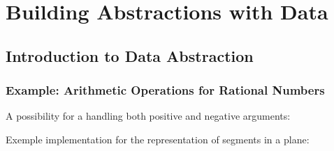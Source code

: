 \chapter{Building Abstractions with Data}

\section{Introduction to Data Abstraction}

\subsection{Example: Arithmetic Operations for Rational Numbers}

\begin{exe}[2.1]
    A possibility for a  handling both positive and negative 
    arguments:
\end{exe}

\begin{exe}[2.2]
    Exemple implementation for the representation of segments in a plane:
\end{exe}
